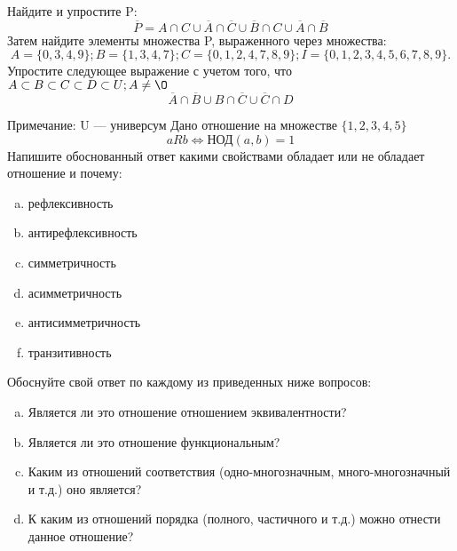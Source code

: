 \documentclass[10pt]{exam}
\begin{document}
\begin{questions}
\question
Найдите и упростите P:
\begin{equation*}
\overline{P} = A \cap C \cup \overline{A} \cap \overline{C} \cup \overline{B} \cap C \cup \overline{A} \cap \overline{B}
\end{equation*}
Затем найдите элементы множества P, выраженного через множества:
\begin{equation*}
A = \{0, 3, 4, 9\}; 
B = \{1, 3, 4, 7\};
C = \{0, 1, 2, 4, 7, 8, 9\};
I = \{0, 1, 2, 3, 4, 5, 6, 7, 8, 9\}.
\end{equation*}\question
Упростите следующее выражение с учетом того, что $A\subset B \subset C \subset D \subset U; A \neq \O$
\begin{equation*}
\overline{A} \cap \overline{B} \cup B \cap \overline{C} \cup \overline{C} \cap D
\end{equation*}

Примечание: U — универсум\question
Дано отношение на множестве $\{1, 2, 3, 4, 5\}$ 
\begin{equation*}
aRb \iff  \text{НОД}(a,b) =1
\end{equation*}
Напишите обоснованный ответ какими свойствами обладает или не обладает отношение и почему:   
\begin{enumerate} [a)]\setcounter{enumi}{0}
\item рефлексивность
\item антирефлексивность
\item симметричность
\item асимметричность
\item антисимметричность
\item транзитивность
\end{enumerate}

Обоснуйте свой ответ по каждому из приведенных ниже вопросов:
\begin{enumerate} [a)]\setcounter{enumi}{0}
    \item Является ли это отношение отношением эквивалентности?
    \item Является ли это отношение функциональным?
    \item Каким из отношений соответствия (одно-многозначным, много-многозначный и т.д.) оно является?
    \item К каким из отношений порядка (полного, частичного и т.д.) можно отнести данное отношение?
\end{enumerate}



\end{questions}
\end{document}
